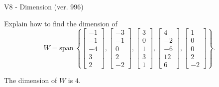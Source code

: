 \begin{exercise}
  \begin{exerciseTitle}V8 - Dimension (ver. 996)\end{exerciseTitle}
  \begin{exerciseStatement}
    Explain how to find the dimension of 
\[W=\mathrm{span}\ \left\{\left[\begin{array}{r}
-1 \\
-1 \\
-4 \\
3 \\
2
\end{array}\right] , \left[\begin{array}{r}
-3 \\
-1 \\
0 \\
2 \\
-2
\end{array}\right] , \left[\begin{array}{r}
3 \\
0 \\
1 \\
3 \\
1
\end{array}\right] , \left[\begin{array}{r}
4 \\
-2 \\
-6 \\
12 \\
6
\end{array}\right] , \left[\begin{array}{r}
1 \\
0 \\
0 \\
2 \\
-2
\end{array}\right]\right\}.\]



  \end{exerciseStatement}
  \begin{exerciseAnswer}
   The dimension of \(W\) is  \(4\).
  


  \end{exerciseAnswer}
\end{exercise}